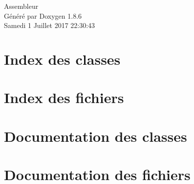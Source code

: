 \documentclass[twoside]{book}
\newcommand{\clearemptydoublepage}{%
  \newpage{\pagestyle{empty}\cleardoublepage}%
}
\begin{document}
\hypersetup{pageanchor=false}
\begin{titlepage}
\vspace*{7cm}
\begin{center}%
{\Large Assembleur }\\
\vspace*{1cm}
{\large Généré par Doxygen 1.8.6}\\
\vspace*{0.5cm}
{\small Samedi 1 Juillet 2017 22:30:43}\\
\end{center}
\end{titlepage}
\clearemptydoublepage
\tableofcontents
\clearemptydoublepage
{}
\hypersetup{pageanchor=true}

\chapter{Index des classes}

\chapter{Index des fichiers}

\chapter{Documentation des classes}




\chapter{Documentation des fichiers}





\newpage
{}
{}
\printindex
\end{document}
